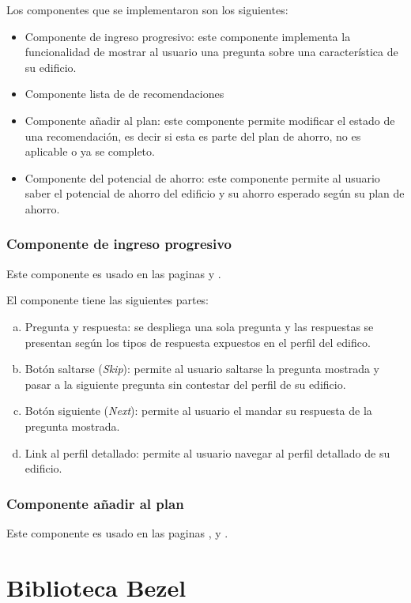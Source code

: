 Los componentes que se implementaron son los siguientes:
\begin{itemize}
\item Componente de ingreso progresivo: este componente implementa
  la funcionalidad de mostrar al usuario una pregunta sobre una
  característica de su edificio.
\item Componente lista de de recomendaciones
\item Componente añadir al plan: este componente permite
  modificar el estado de una recomendación, es decir si esta es parte del
  plan de ahorro, no es aplicable o ya se completo.
\item Componente del potencial de ahorro: este componente permite
  al usuario saber el potencial de ahorro del edificio y su
  ahorro esperado según su plan de ahorro.
\end{itemize}


\subsubsection{Componente de ingreso progresivo}

Este componente es usado en las paginas  y
.

El componente tiene las siguientes partes:
\begin{enumerate}[a)]
\item Pregunta y respuesta: se despliega una sola pregunta y
  las respuestas se presentan según los tipos de respuesta expuestos
  en el perfil del edifico.
\item Botón saltarse (\textit{Skip}): permite al usuario saltarse
  la pregunta mostrada y pasar a la siguiente pregunta sin contestar del perfil
  de su edificio.
\item Botón siguiente (\textit{Next}): permite al usuario el mandar
  su respuesta de la pregunta mostrada.
\item Link al perfil detallado: permite al usuario navegar al perfil
  detallado de su edificio.
\end{enumerate}

\subsubsection{Componente añadir al plan}

Este componente es usado en las paginas ,
 y .

\section{Biblioteca Bezel}
